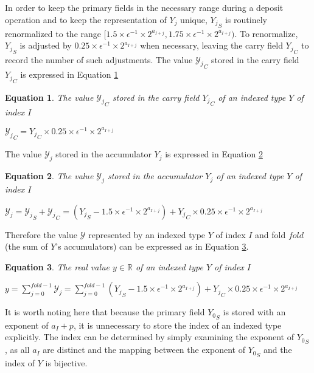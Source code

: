 \documentclass[12pt]{article}
\providecommand{\R}{\ensuremath{\mathbb{R}}}
\theoremstyle{plain}
\newtheorem{eq}{Equation}[section]
\begin{document}
      In order to keep the primary fields in the necessary range during a deposit operation and to keep the representation of $Y_j$ unique, ${Y_j}_S$ is routinely renormalized to the range $[1.5 \times\epsilon^{-1} \times 2^{a_{I + j}}, 1.75 \times\epsilon^{-1} \times 2^{a_{I + j}})$.
      To renormalize, ${Y_j}_S$ is adjusted by $0.25 \times\epsilon^{-1} \times 2^{a_{I + j}}$ when necessary, leaving the carry field ${Y_j}_C$ to record the number of such adjustments.
      The value ${\mathcal{Y}_j}_C$ stored in the carry field ${Y_j}_C$ is expressed in Equation \ref{eq:car}
      \begin{eq} The value ${\mathcal{Y}_j}_C$ stored in the carry field ${Y_j}_C$ of an indexed type $Y$ of index $I$

        ${\mathcal{Y}_j}_C = {Y_j}_C \times 0.25\times\epsilon^{-1}\times2^{a_{I + j}}$
        \label{eq:car}
      \end{eq}
      The value $\mathcal{Y}_j$ stored in the accumulator $Y_j$ is expressed in Equation \ref{eq:acc}
      \begin{eq} The value $\mathcal{Y}_j$ stored in the accumulator $Y_j$ of an indexed type $Y$ of index $I$

        $\mathcal{Y}_j = {\mathcal{Y}_j}_S + {\mathcal{Y}_j}_C = ({Y_j}_S - 1.5 \times\epsilon^{-1}\times 2^{a_{I + j}}) + {Y_j}_C \times 0.25\times\epsilon^{-1}\times2^{a_{I + j}}$
        \label{eq:acc}
      \end{eq}
      Therefore the value $\mathcal{Y}$ represented by an indexed type $Y$ of index $I$ and fold $fold$ (the sum of $Y$'s accumulators) can be expressed as in Equation \ref{eq:indexedvalue}.
      \begin{eq} The real value $y \in \R$ of an indexed type $Y$ of index $I$

        $y = \sum\limits_{j = 0}^{fold - 1} \mathcal{Y}_j = \sum\limits_{j = 0}^{fold - 1} ({Y_j}_S - 1.5 \times\epsilon^{-1}\times 2^{a_{I + j}}) + {Y_j}_C \times 0.25\times\epsilon^{-1}\times2^{a_{I + j}}$
        \label{eq:indexedvalue}
      \end{eq}
      It is worth noting here that because the primary field ${Y_0}_S$ is stored with an exponent of $a_I + p$, it is unnecessary to store the index of an indexed type explicitly. The index can be determined by simply examining the exponent of ${Y_0}_S$, as all $a_I$ are distinct and the mapping between the exponent of ${Y_0}_S$ and the index of $Y$ is bijective.
\end{document}
